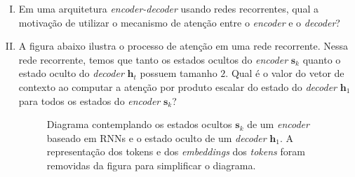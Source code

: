 \documentclass{dlproblemset}
\begin{document}
\begin{enumerate}[I)]
\item Em uma arquitetura \textit{encoder-decoder} usando redes recorrentes, qual a motivação de utilizar o mecanismo de atenção entre o \textit{encoder} e o \textit{decoder}?

\item A figura abaixo ilustra o processo de atenção em uma rede recorrente. Nessa rede recorrente, temos que tanto os estados ocultos do \textit{encoder} $\mathbf{s}_k$ quanto o estado oculto do \textit{decoder} $\mathbf{h}_t$ possuem tamanho $2$. Qual é o valor do vetor de contexto ao computar a atenção por produto escalar do estado do \textit{decoder} $\mathbf{h}_1$ para todos os estados do \textit{encoder} $\mathbf{s}_k$?

\begin{figure}[H]
    \centering
    \caption{Diagrama contemplando os estados ocultos $\mathbf{s}_k$ de um \textit{encoder} baseado em RNNs e o estado oculto de um \textit{decoder} $\mathbf{h}_1$. A representação dos tokens e dos \textit{embeddings} dos \textit{tokens} foram removidas da figura para simplificar o diagrama.}
    \label{fig:rnn-attention}
\end{figure}

\end{enumerate}
\end{document}
